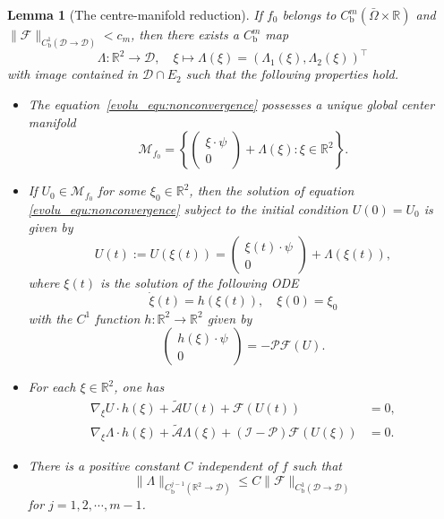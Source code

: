 \documentclass{elsarticle}
\newtheorem{lemma}{Lemma}[section]
\begin{document}
\begin{lemma}[The centre-manifold reduction]\label{cm_reduction}
If $f_0$ belongs to $C^m_{\mathrm{b}}(\bar{\Omega}\times\mathbb{R})$ and $\|\mathcal{F}\|_{C^{1}_{\mathrm{b}}(\mathcal{D}\rightarrow \mathcal{D})} < c_m$, then there exists a $C^m_{\mathrm{b}}$ map 
\[
	\Lambda: \mathbb{R}^2\rightarrow \mathcal{D},\quad  \xi\mapsto \Lambda(\xi)=(\Lambda_1(\xi), \Lambda_2(\xi))^{\top}
\]
with image contained in $\mathcal{D}\cap E_2$ such that the following properties hold.
\begin{itemize}
\item[{\rm(1)}] The equation~\eqref{evolu_equ:nonconvergence} possesses a unique global center manifold
\[
\mathcal{M}_{f_0} = \left\{
\left(
\begin{array}{c}
\xi\cdot\psi \\
0
\end{array}
\right)
+\Lambda(\xi): \xi\in\mathbb{R}^2 
\right\}.
\]
\item[{\rm(2)}] If $U_0 \in \mathcal{M}_{f_0}$ for some $\xi_0\in\mathbb{R}^2$, then the solution of equation \eqref{evolu_equ:nonconvergence} subject to the initial condition $U(0) = U_0$ is given by
\[
U(t):=U(\xi(t))=
\left(
\begin{array}{c}
\xi(t)\cdot\psi \\
0
\end{array}
\right)
+\Lambda(\xi(t)),
\]
where $\xi(t)$ is the solution of the following ODE
\begin{equation} \label{cmr_ode}
\dot{\xi}(t) = h(\xi(t)), \quad \xi(0) = \xi_0
\end{equation}
with the $C^1$ function $h: \mathbb{R}^2\rightarrow \mathbb{R}^2$ given by
\begin{equation} \label{cmr_ode1}
\left(
\begin{array}{c}
h(\xi)\cdot\psi \\
0
\end{array}
\right)
=
-\mathcal{P}\mathcal{F}(U).
\end{equation}
\item[{\rm(3)}] For each $\xi\in\mathbb{R}^2$, one has
\begin{equation}\label{cmr_ode2}
\begin{split}
	\nabla_{\xi} U \cdot h(\xi) + \tilde{\mathcal{A}}U(t) + \mathcal{F}(U(t)) &= 0,\\
	\nabla_{\xi} \Lambda \cdot h(\xi) + \tilde{\mathcal{A}}\Lambda(\xi) + (\mathcal{I}-\mathcal{P})\mathcal{F}(U(\xi)) &= 0.
\end{split}
\end{equation}
\item[{\rm(4)}] There is a positive constant $C$ independent of $f$ such that
\begin{equation}\label{cmr_estimate}
	\|\Lambda\|_{C^{j-1}_{\mathrm{b}}(\mathbb{R}^2\rightarrow \mathcal{D})} \leqslant C\|\mathcal{F}\|_{C^{1}_{\mathrm{b}}(\mathcal{D}\rightarrow \mathcal{D})}
\end{equation}
 for $j=1, 2, \cdots, m-1$.
\end{itemize}
\end{lemma}
\end{document}
